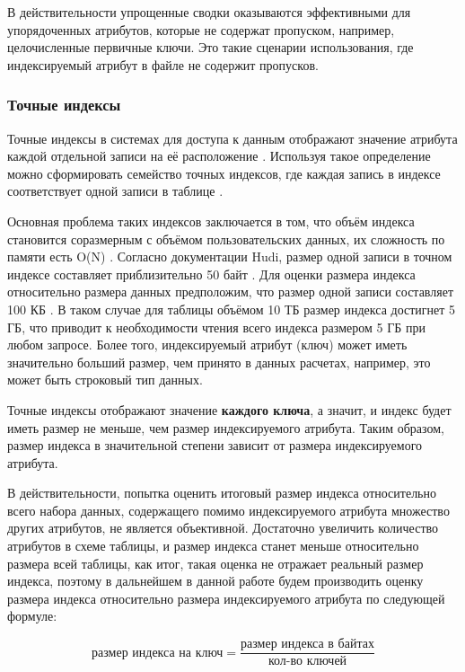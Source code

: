 В действительности упрощенные сводки оказываются эффективными для упорядоченных атрибутов, которые не содержат пропуском, например, целочисленные первичные ключи. Это такие сценарии использования, где индексируемый атрибут в файле не содержит пропусков.


\subsubsection{Точные индексы} 

Точные индексы в системах для доступа к данным отображают значение атрибута каждой отдельной записи на её расположение \cite{Hudi_RLI}. Используя такое определение можно сформировать семейство точных индексов, где каждая запись в индексе соответствует одной записи в таблице \cite{Tree_Data_Structures_and_Efficient_Indexing_Techniques}.

Основная проблема таких индексов заключается в том, что объём индекса становится соразмерным с объёмом пользовательских данных, их сложность по памяти есть O(N) \cite{Tree_Data_Structures_and_Efficient_Indexing_Techniques}. Согласно документации Hudi, размер одной записи в точном индексе составляет приблизительно 50 байт \cite{Hudi_RLI}. Для оценки размера индекса относительно размера данных предположим, что размер одной записи составляет 100 КБ \cite{Hudi_RLI}. В таком случае для таблицы объёмом 10 ТБ размер индекса достигнет 5 ГБ, что приводит к необходимости чтения всего индекса размером 5 ГБ при любом запросе. Более того, индексируемый атрибут (ключ) может иметь значительно больший размер, чем принято в данных расчетах, например, это может быть строковый тип данных.

Точные индексы отображают значение \textbf{каждого ключа}, а значит, и индекс будет иметь размер не меньше, чем размер индексируемого атрибута. Таким образом, размер индекса в значительной степени зависит от размера индексируемого атрибута.

В действительности, попытка оценить итоговый размер индекса относительно всего набора данных, содержащего помимо индексируемого атрибута множество других атрибутов, не является объективной. Достаточно увеличить количество атрибутов в схеме таблицы, и размер индекса станет меньше относительно размера всей таблицы, как итог, такая оценка не отражает реальный размер индекса, поэтому в дальнейшем в данной работе будем производить оценку размера индекса относительно размера индексируемого атрибута по следующей формуле:

\begin{equation}\label{size_per_key}
    \textrm{размер индекса на ключ} = \frac{\textrm{размер индекса в байтах}}{\textrm{кол-во ключей}}
\end{equation}


